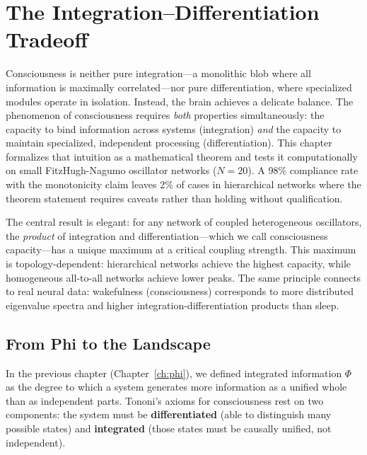 
\chapter{The Integration--Differentiation Tradeoff}
\label{ch:id-tradeoff}

Consciousness is neither pure integration---a monolithic blob where all information is maximally correlated---nor pure differentiation, where specialized modules operate in isolation. Instead, the brain achieves a delicate balance. The phenomenon of consciousness requires \textit{both} properties simultaneously: the capacity to bind information across systems (integration) \textit{and} the capacity to maintain specialized, independent processing (differentiation). This chapter formalizes that intuition as a mathematical theorem and tests it computationally on small FitzHugh-Nagumo oscillator networks ($N=20$). A 98\% compliance rate with the monotonicity claim leaves 2\% of cases in hierarchical networks where the theorem statement requires caveats rather than holding without qualification.

The central result is elegant: for any network of coupled heterogeneous oscillators, the \textit{product} of integration and differentiation---which we call consciousness capacity---has a unique maximum at a critical coupling strength. This maximum is topology-dependent: hierarchical networks achieve the highest capacity, while homogeneous all-to-all networks achieve lower peaks. The same principle connects to real neural data: wakefulness (consciousness) corresponds to more distributed eigenvalue spectra and higher integration-differentiation products than sleep.

\section{From Phi to the Landscape}

In the previous chapter (Chapter~\ref{ch:phi}), we defined integrated information $\Phi$ as the degree to which a system generates more information as a unified whole than as independent parts. Tononi's axioms for consciousness rest on two components: the system must be \textbf{differentiated} (able to distinguish many possible states) and \textbf{integrated} (those states must be causally unified, not independent).

